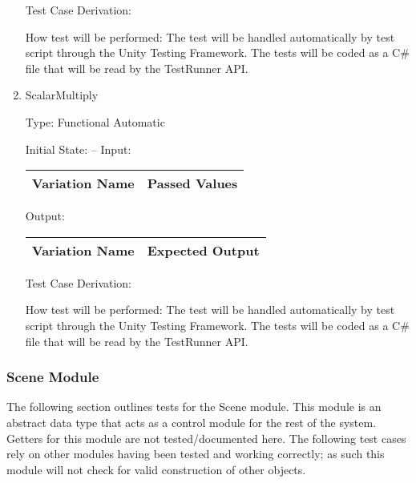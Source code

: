 \documentclass[12pt, titlepage]{article}
\begin{document}
\begin{enumerate}
	Test Case Derivation: 
	
	How test will be performed: The test will be handled automatically by test 
	script through the Unity Testing Framework. The tests will be coded as a 
	C\# file that will be read by the TestRunner API.
	
	\item{ScalarMultiply\\}
	
	Type: Functional Automatic
	
	Initial State: --
	Input: 
	\begin{tabular}{|c|c|}
		\hline
		\textbf{Variation Name} & \textbf{Passed Values}\\
		\hline
		
		\hline
	\end{tabular}
	
	Output:
	\begin{tabular}{|c|c|}
		\hline
		\textbf{Variation Name} & \textbf{Expected Output}\\
		\hline
		
		\hline
	\end{tabular}
	
	Test Case Derivation: 
	
	How test will be performed: The test will be handled automatically by test 
	script through the Unity Testing Framework. The tests will be coded as a 
	C$\#$ file that will be read by the TestRunner API.  
	
\end{enumerate}

\subsubsection{Scene Module}
The following section outlines tests for the Scene module. This module is an 
abstract data type that acts as a control module for the rest of the system. 
Getters for this module are not tested/documented here. The following test 
cases rely on other modules having been tested and working correctly; as such 
this module will not check for valid construction of other objects.
\end{document}

